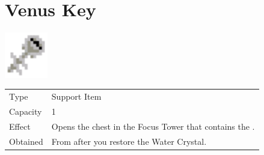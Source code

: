 \section{Venus Key}
\label{item:venus_key}

\includegraphics[height=2cm,keepaspectratio]{./resources/items/venuskey}

\begin{longtable}{ l p{9cm} }
	Type
	& Support Item
\\ %
	Capacity
	& 1
\\ %
	Effect
	& Opens the chest in the Focus Tower that contains the \nameref{armor:venus_shield}.
\\ %
	Obtained
	& From \nameref{char:spencer} after you restore the Water Crystal.
\end{longtable}
